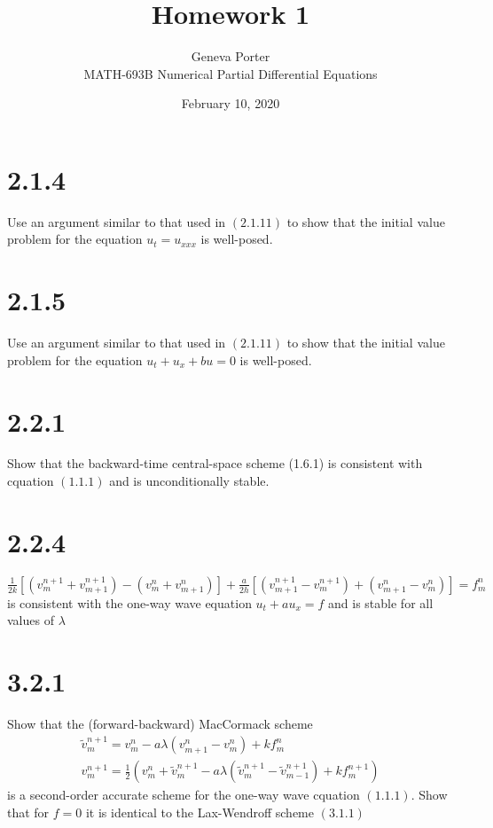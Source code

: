 \documentclass[12pt]{article}
\title{Homework 1}
\author{Geneva Porter\\ 
MATH-693B Numerical Partial Differential Equations\\}
\date{February 10, 2020}
\begin{document}
\maketitle

\section*{2.1.4}
Use an argument similar to that used in $(2.1 .11)$ to show that the initial value problem for the equation $u_{t}=u_{x x x}$ is well-posed.

\section*{2.1.5}
Use an argument similar to that used in $(2.1 .11)$ to show that the initial value problem for the equation $u_{t}+u_{x}+b u=0$ is well-posed.

\section*{2.2.1}
Show that the backward-time central-space scheme (1.6.1) is consistent with cquation $(1.1 .1)$ and is unconditionally stable.

\section*{2.2.4}
$\frac{1}{2 k}\left[\left(v_{m}^{n+1}+v_{m+1}^{n+1}\right)-\left(v_{m}^{n}+v_{m+1}^{n}\right)\right]+\frac{a}{2 h}\left[\left(v_{m+1}^{n+1}-v_{m}^{n+1}\right)+\left(v_{m+1}^{n}-v_{m}^{n}\right)\right]=f_{m}^{n}$
is consistent with the one-way wave equation $u_{t}+a u_{x}=f$ and is stable for all values of $\lambda$

\section*{3.2.1}
Show that the (forward-backward) MacCormack scheme
$$
\begin{array}{l}
{\tilde{v}_{m}^{n+1}=v_{m}^{n}-a \lambda\left(v_{m+1}^{n}-v_{m}^{n}\right)+k f_{m}^{n}} \\
{v_{m}^{n+1}=\frac{1}{2}\left(v_{m}^{n}+\tilde{v}_{m}^{n+1}-a \lambda\left(\tilde{v}_{m}^{n+1}-\tilde{v}_{m-1}^{n+1}\right)+k f_{m}^{n+1}\right)}
\end{array}
$$
is a second-order accurate scheme for the one-way wave cquation $(1.1 .1) .$ Show that for $f=0$ it is identical to the Lax-Wendroff scheme $(3.1 .1)$
\end{document}
